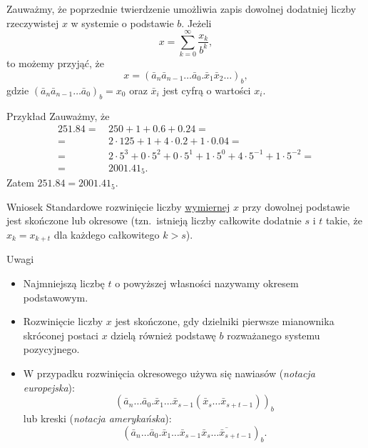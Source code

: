 \documentclass[a4paper,10pt]{beamer}
\begin{document}
\begin{frame}
	
	Zauważmy, że poprzednie twierdzenie umożliwia zapis dowolnej dodatniej liczby rzeczywistej $x$ w systemie o podstawie $b$. Jeżeli $$x=\sum\limits_{k=0}^\infty\frac{x_k}{b^k},$$ to możemy przyjąć, że
	$$x=(\bar{a}_n\bar{a}_{n-1}\ldots \bar{a}_0.\bar{x}_1\bar{x}_2\ldots)_b,$$
	gdzie $(\bar{a}_n\bar{a}_{n-1}\ldots \bar{a}_0)_b=x_0$ oraz $\bar{x}_i$ jest cyfrą o wartości $x_i$. 
	
	
	
\begin{exampleblock}{Przykład}
Zauważmy, że 
\begin{align*}
251.84=&\,250+1+0.6+0.24=\\
=&\,2\cdot125+1+4\cdot0.2+1\cdot0.04=\\
=&\,2\cdot5^3+0\cdot5^2+0\cdot5^1+1\cdot5^0+4\cdot5^{-1}+1\cdot5^{-2}=\\
=&\,2001.41_5.
\end{align*}
Zatem $251.84=2001.41_5$.

\end{exampleblock}	

	
\end{frame}






\begin{frame}

	\begin{block}{Wniosek}
		Standardowe rozwinięcie liczby \underline{wymiernej} $x$ przy dowolnej podstawie jest skończone lub okresowe (tzn.~istnieją liczby całkowite dodatnie $s$ i $t$ takie, że $x_k=x_{k+t}$ dla każdego całkowitego $k>s$).
	\end{block}
	
	\begin{block}{Uwagi}
	\begin{itemize}
		\item Najmniejszą liczbę $t$ o powyższej własności nazywamy okresem podstawowym.
		\item Rozwinięcie liczby $x$ jest skończone, gdy dzielniki pierwsze mianownika skróconej postaci $x$ dzielą również podstawę $b$ rozważanego systemu pozycyjnego.
		\item W przypadku rozwinięcia okresowego używa się nawiasów ({\it notacja europejska}):
		$$(\bar{a}_n\ldots\bar{a}_0.\bar{x}_1\ldots\bar{x}_{s-1}(\bar{x}_s\ldots \bar{x}_{s+t-1}))_b$$
		lub kreski ({\it notacja amerykańska}):
		$$(\bar{a}_n\ldots\bar{a}_0.\bar{x}_1\ldots\bar{x}_{s-1}\overline{\bar{x}_s\ldots \bar{x}_{s+t-1}})_b.$$
	\end{itemize}
	\end{block}
	
\end{frame}
\end{document}
